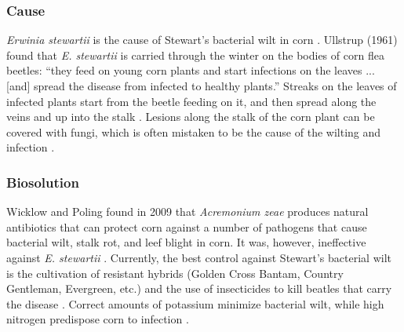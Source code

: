 \documentclass[12pt]{article}
\begin{document}
\subsubsection{Cause}

\emph{Erwinia stewartii} is the cause of Stewart's bacterial wilt in corn \autocite{ullstrup1961corn}. Ullstrup (1961) found that \emph{E. stewartii} is carried through the winter on the bodies of corn flea beetles: ``they feed on young corn plants and start infections on the leaves ... [and] spread the disease from infected to healthy plants.'' Streaks on the leaves of infected plants start from the beetle feeding on it, and then spread along the veins and up into the stalk \autocite{robert1967bacterial}. Lesions along the stalk of the corn plant can be covered with fungi, which is often mistaken to be the cause of the wilting and infection \autocite{ullstrup1961corn}.

\subsubsection{Biosolution}

Wicklow and Poling found in 2009 that \emph{Acremonium zeae} produces natural antibiotics that can protect corn against a number of pathogens that cause bacterial wilt, stalk rot, and leef blight in corn. It was, however, ineffective against \emph{E. stewartii} \autocite{wicklow2009antimicrobial}. Currently, the best control against Stewart's bacterial wilt is the cultivation of resistant hybrids (Golden Cross Bantam, Country Gentleman, Evergreen, etc.) and the use of insecticides to kill beatles that carry the disease \autocite{ullstrup1961corn}. Correct amounts of potassium minimize bacterial wilt, while high nitrogen predispose corn to infection \autocite{ullstrup1961corn}.

\newpage


\printbibliography
\end{document}
